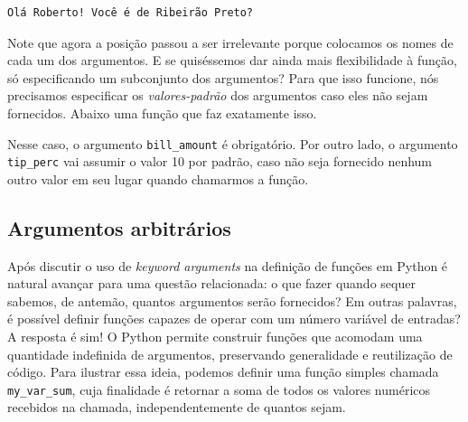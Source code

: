 \documentclass[
  brazilian,
  letterpaper,
  DIV=11,
  numbers=noendperiod]{scrreprt}
\newenvironment{Shaded}{\begin{snugshade}}{\end{snugshade}}
\newcommand{\BuiltInTok}[1]{\textcolor[rgb]{0.00,0.23,0.31}{#1}}
\newcommand{\DecValTok}[1]{\textcolor[rgb]{0.68,0.00,0.00}{#1}}
\newcommand{\KeywordTok}[1]{\textcolor[rgb]{0.00,0.23,0.31}{\textbf{#1}}}
\newcommand{\NormalTok}[1]{\textcolor[rgb]{0.00,0.23,0.31}{#1}}
\newcommand{\OperatorTok}[1]{\textcolor[rgb]{0.37,0.37,0.37}{#1}}
\newcommand{\StringTok}[1]{\textcolor[rgb]{0.13,0.47,0.30}{#1}}
\begin{document}
\begin{verbatim}
Olá Roberto! Você é de Ribeirão Preto?
\end{verbatim}

Note que agora a posição passou a ser irrelevante porque colocamos os
nomes de cada um dos argumentos. E se quiséssemos dar ainda mais
flexibilidade à função, só especificando um subconjunto dos argumentos?
Para que isso funcione, nós precisamos especificar os
\emph{valores-padrão} dos argumentos caso eles não sejam fornecidos.
Abaixo uma função que faz exatamente isso.

\begin{Shaded}
\end{Shaded}

Nesse caso, o argumento \texttt{bill\_amount} é obrigatório. Por outro
lado, o argumento \texttt{tip\_perc} vai assumir o valor 10 por padrão,
caso não seja fornecido nenhum outro valor em seu lugar quando chamarmos
a função.

\subsection{Argumentos arbitrários}\label{argumentos-arbitruxe1rios}

Após discutir o uso de \emph{keyword arguments} na definição de funções
em Python é natural avançar para uma questão relacionada: o que fazer
quando sequer sabemos, de antemão, quantos argumentos serão fornecidos?
Em outras palavras, é possível definir funções capazes de operar com um
número variável de entradas? A resposta é sim! O Python permite
construir funções que acomodam uma quantidade indefinida de argumentos,
preservando generalidade e reutilização de código. Para ilustrar essa
ideia, podemos definir uma função simples chamada \texttt{my\_var\_sum},
cuja finalidade é retornar a soma de todos os valores numéricos
recebidos na chamada, independentemente de quantos sejam.
\end{document}
